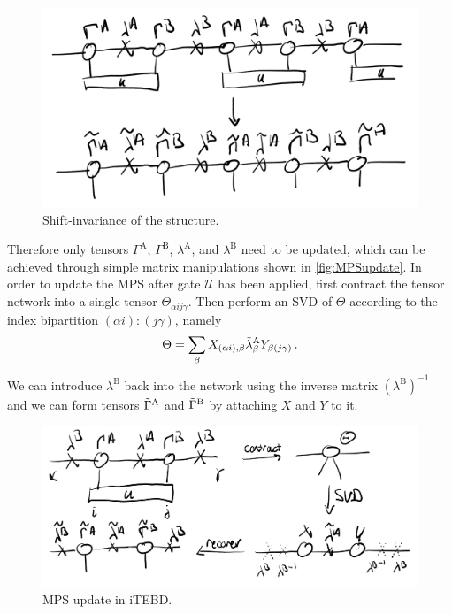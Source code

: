         \begin{figure}[!h]
            \centering
            \includegraphics[scale=0.2]{graphs/invarianceitebd.png}
            \caption{Shift-invariance of the structure.}
            \label{fig:invarianceitebd}
        \end{figure}

        Therefore only tensors $\Gamma^\text{A}$, $\Gamma^\text{B}$, $\lambda^\text{A}$, and $\lambda^\text{B}$ need to be updated, which can be achieved through simple matrix manipulations shown in \autoref{fig:MPSupdate}. In order to update the MPS after gate $\mathcal{U}$ has been applied, first contract the tensor network into a single tensor $\Theta_{\alpha ij\gamma}$. Then perform an SVD of $\Theta$ according to the index bipartition $(\alpha i):(j\gamma)$, namely
        \begin{equation}
            \Theta=\sum_{\beta}X_{(\alpha i),\beta}\Tilde{\lambda}_\beta^\text{A}Y_{\beta(j\gamma)}\,.
        \end{equation}
        We can introduce $\lambda^\text{B}$ back into the network using the inverse matrix $(\lambda^\text{B})^{-1}$ and we can form tensors $\Tilde{\Gamma}^\text{A}$ and $\Tilde{\Gamma}^\text{B}$ by attaching $X$ and $Y$ to it. 
        \begin{figure}[h!]
            \centering
            \includegraphics[scale=0.2]{graphs/MPSupdate.png}
            \caption{MPS update in iTEBD.}
            \label{fig:MPSupdate}
        \end{figure}


